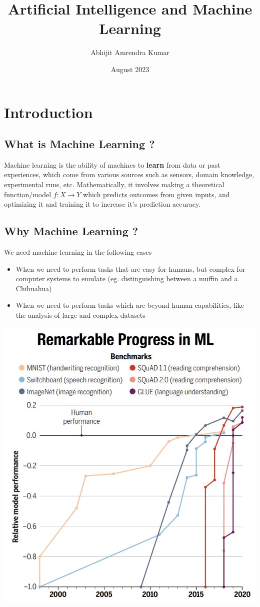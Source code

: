 \documentclass{report}
\title{Artificial Intelligence and Machine Learning}
\author{Abhijit Amrendra Kumar}
\date{August 2023}
\begin{document}
\maketitle

\chapter{Introduction}
\section{What is Machine Learning ?}

Machine learning is the ability of machines to \textbf{learn} from data or past experiences, which come from various sources such as sensors, domain knowledge, experimental runs, etc. Mathematically, it involves making a theoretical function/model $f: X \rightarrow Y$ which predicts outcomes from given inputs, and optimizing it and training it to increase it's prediction accuracy.

\section{Why Machine Learning ?}

We need machine learning in the following cases
\begin{itemize}
  \item When we need to perform tasks that are easy for humans, but complex for computer systems to emulate (eg. distinguishing between a muffin and a Chihuahua)
  \item When we need to perform tasks which are beyond human capabilities, like the analysis of large and complex datasets
\end{itemize}

\begin{center}
  \includegraphics[scale=0.25]{"images/aiml-01.jpg"}
\end{center}
\end{document}

